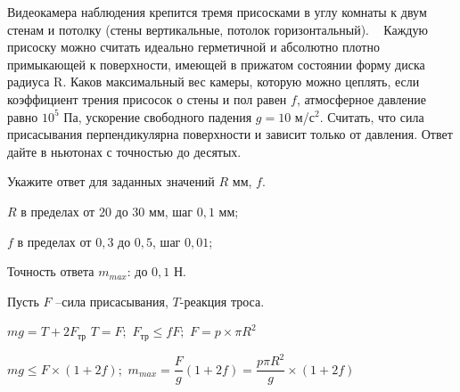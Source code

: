 Видеокамера наблюдения крепится тремя присосками в углу
комнаты к двум стенам и потолку (стены вертикальные, потолок горизонтальный).   Каждую
присоску можно считать идеально герметичной и абсолютно плотно примыкающей к поверхности,
имеющей в прижатом состоянии форму диска радиуса R. Каков
максимальный вес камеры, которую можно цеплять, если коэффициент трения
присосок о стены и пол равен $f$, атмосферное
давление равно $10^5$ Па, ускорение свободного падения $g = 10$ м/с$^2$. Считать, что
сила присасывания перпендикулярна поверхности и зависит только от давления. Ответ дайте в ньютонах с точностью до десятых.

Укажите ответ для заданных значений $R$ мм, $f$.

\paramSection

$R$  в пределах от $20$ до $30$ мм, шаг $0,1$ мм;

$f$ в пределах от $0,3$ до $0,5$, шаг $0,01$;

Точность ответа $m_{max}$: до $0,1$ Н.

\soultionSection

Пусть $F$ –сила присасывания, $T$-реакция троса.

$mg=T+2F_{\text{тр}}$     $T=F;$     $ F_{\text{тр}} \leq fF;$   $F=p \times \pi R^2$  

$mg \leq F \times (1+2f);$     $m_{max}=\dfrac{F}{g}(1+2f)=\dfrac{p\pi R^2}{g} \times (1+2f)$

